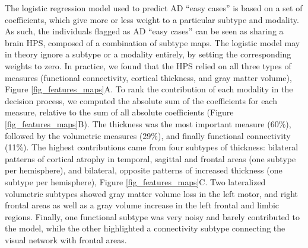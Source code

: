\documentclass[authoryear]{elsarticle}
\begin{document}
The logistic regression model used to predict AD ``easy cases'' is based on a set of coefficients, which give more or less weight to a particular subtype and modality. As such, the individuals flagged as AD ``easy cases'' can be seen as sharing a brain HPS, composed of a combination of subtype maps. The logistic model may in theory ignore a subtype or a modality entirely, by setting the corresponding weights to zero. In practice, we found that the HPS relied on all three types of measures (functional connectivity, cortical thickness, and gray matter volume), Figure \ref{fig_features_maps}A. To rank the contribution of each modality in the decision process, we computed the absolute sum of the coefficients for each measure, relative to the sum of all absolute coefficients (Figure \ref{fig_features_maps}B). The thickness was the most important measure (60\%), followed by the volumetric measures (29\%), and finally functional connectivity (11\%). The highest contributions came from four subtypes of thickness: bilateral patterns of cortical atrophy in temporal, sagittal and frontal areas (one subtype per hemisphere), and bilateral, opposite patterns of increased thickness (one subtype per hemisphere), Figure \ref{fig_features_maps}C. Two lateralized volumetric subtypes showed gray matter volume loss in the left motor, and right frontal areas as well as a gray volume increase in the left frontal and limbic regions. Finally, one functional subtype was very noisy and barely contributed to the model, while the other highlighted a connectivity subtype connecting the visual network with frontal areas. 
\end{document}
